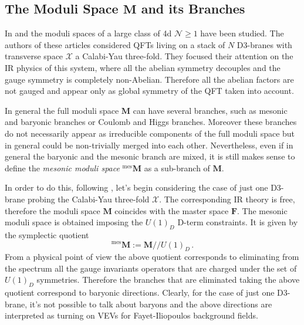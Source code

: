\documentclass[main.tex]{subfiles}
\begin{document}
\subsection{The Moduli Space \texorpdfstring{$\mathbf{M}$}{M} and its Branches}
In \cite{Forcella:2008bb} and \cite{Forcella:2007wk,Forcella:2008eh,Forcella:2008ng} the moduli spaces of a large class of 4d $\mathcal{N}\geq1$ have been studied. The authors of these articles considered QFTs living on a stack of $N$ D$3$-branes with transverse space $\mathcal{X}$ a Calabi-Yau three-fold. They focused their attention on the IR physics of this system, where all the abelian symmetry decouples and the gauge symmetry is completely non-Abelian. Therefore all the abelian factors are not gauged and appear only as global symmetry of the QFT taken into account. 

In general the full moduli space $\mathbf{M}$ can have several branches, such as mesonic and baryonic branches or Coulomb and Higgs branches. Moreover these branches do not necessarily appear as irreducible components of the full moduli space but in general could be non-trivially merged into each other. Nevertheless, even if in general the baryonic and the mesonic branch are mixed, it is still makes sense to define the \textit{mesonic moduli space} ${}^{\text{mes}}\mathbf{M}$ as a sub-branch of $\mathbf{M}$. 

In order to do this, following \cite{Forcella:2008bb}, let's begin considering  the case of just one D3-brane probing the Calabi-Yau three-fold $\mathcal{X}$. The corresponding IR theory is free, therefore the moduli space $\mathbf{M}$ coincides with the master space $\mathbf{F}$.
The mesonic moduli space is obtained imposing the $U(1)_{D}$ D-term constraints. It is given by the symplectic quotient
\begin{equation}
\label{eq:mes}
{}^{\textrm{mes}}\mathbf{M} := \mathbf{M} // U(1)_{D}\, .
\end{equation}
From a physical point of view the above quotient corresponds to eliminating from the spectrum all the gauge invariants operators that are charged under the set of $U(1)_{D}$ symmetries. Therefore the branches that are eliminated taking the above quotient correspond to baryonic directions. Clearly, for the case of just one D3-brane, it's not possible to talk about baryons and the above directions are interpreted as turning on VEVs for Fayet-Iliopoulos background fields.
\end{document}

